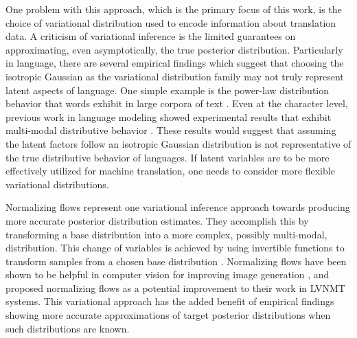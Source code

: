 
One problem with this approach, which is the primary focus of this work, is the choice of variational distribution used to encode information about translation data. A criticism of variational inference is the limited guarantees on approximating, even asymptotically, the true posterior distribution. Particularly in language, there are several empirical findings which suggest that choosing the isotropic Gaussian as the variational distribution family may not truly represent latent aspects of language. One simple example is the power-law distribution behavior that words exhibit in large corpora of text \cite{koehnSMT2010}. Even at the character level, previous work in language modeling showed experimental results that exhibit multi-modal distributive behavior \cite{ziegler2019LatentNFforDiscrete}. These results would suggest that assuming the latent factors follow an isotropic Gaussian distribution is not representative of the true distributive behavior of languages. If latent variables are to be more effectively utilized for machine translation, one needs to consider more flexible variational distributions. 

Normalizing flows represent one variational inference approach towards producing more accurate posterior distribution estimates. They accomplish this by transforming a base distribution into a more complex, possibly multi-modal, distribution. This change of variables is achieved by using invertible functions to transform samples from a chosen base distribution \cite{rezende2015VIwithNF}. Normalizing flows have been shown to be helpful in computer vision for improving image generation \cite{ kingma2016IAF, tomczak2016Householder,kingma2018GLOW, Berg2018SylvesterNF}, and \citet{schulz2018StochasticDecoder} proposed normalizing flows as a potential improvement to their work in LVNMT systems. This variational approach has the added benefit of empirical findings showing more accurate approximations of target posterior distributions when such distributions are known.

